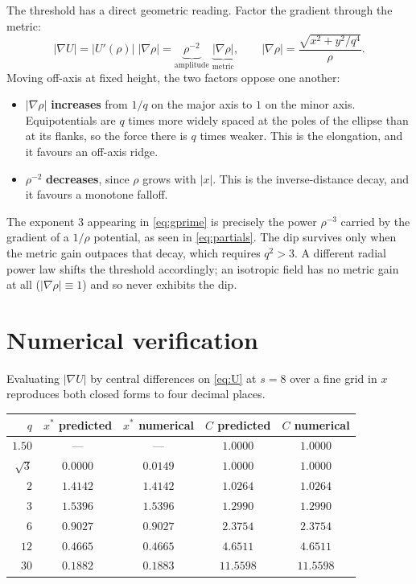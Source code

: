 \documentclass[11pt]{article}
\begin{document}
The threshold has a direct geometric reading. Factor the gradient through the
metric:
\begin{equation}
  |\nabla U|
  =\bigl|U'(\rho)\bigr|\;\bigl|\nabla\rho\bigr|
  =\underbrace{\rho^{-2}}_{\text{amplitude}}\;
   \underbrace{\bigl|\nabla\rho\bigr|}_{\text{metric}},
  \qquad
  \bigl|\nabla\rho\bigr|=\frac{\sqrt{x^{2}+y^{2}/q^{4}}}{\rho} .
\end{equation}
Moving off-axis at fixed height, the two factors oppose one another:
\begin{itemize}
  \item $|\nabla\rho|$ \textbf{increases} from $1/q$ on the major axis to $1$
        on the minor axis. Equipotentials are $q$ times more widely spaced at
        the poles of the ellipse than at its flanks, so the force there is
        $q$ times weaker. This is the elongation, and it favours an off-axis
        ridge.
  \item $\rho^{-2}$ \textbf{decreases}, since $\rho$ grows with $|x|$. This is
        the inverse-distance decay, and it favours a monotone falloff.
\end{itemize}
The exponent $3$ appearing in \eqref{eq:gprime} is precisely the power
$\rho^{-3}$ carried by the gradient of a $1/\rho$ potential, as seen in
\eqref{eq:partials}. The dip survives only when the metric gain outpaces that
decay, which requires $q^{2}>3$. A different radial power law shifts the
threshold accordingly; an isotropic field has no metric gain at all
($|\nabla\rho|\equiv1$) and so never exhibits the dip.

\section{Numerical verification}

Evaluating $|\nabla U|$ by central differences on \eqref{eq:U} at $s=8$ over a
fine grid in $x$ reproduces both closed forms to four decimal places.

\begin{center}
\begin{tabular}{rcccc}
\toprule
$q$ & $x^{*}$ predicted & $x^{*}$ numerical & $C$ predicted & $C$ numerical\\
\midrule
$1.50$        & ---      & ---      & $1.0000$  & $1.0000$\\
$\sqrt{3}$    & $0.0000$ & $0.0149$ & $1.0000$  & $1.0000$\\
$2$           & $1.4142$ & $1.4142$ & $1.0264$  & $1.0264$\\
$3$           & $1.5396$ & $1.5396$ & $1.2990$  & $1.2990$\\
$6$           & $0.9027$ & $0.9027$ & $2.3754$  & $2.3754$\\
$12$          & $0.4665$ & $0.4665$ & $4.6511$  & $4.6511$\\
$30$          & $0.1882$ & $0.1883$ & $11.5598$ & $11.5598$\\
\bottomrule
\end{tabular}
\end{center}
\end{document}
